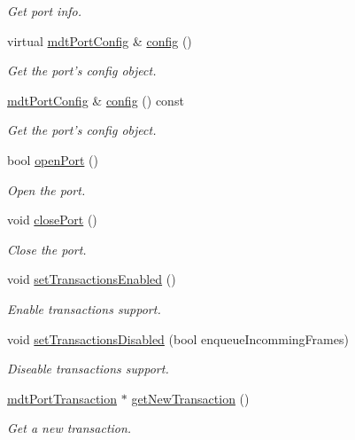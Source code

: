 \begin{DoxyCompactItemize}
\begin{DoxyCompactList}\small\item\em Get port info. \end{DoxyCompactList}\item 
virtual \hyperlink{classmdt_port_config}{mdtPortConfig} \& \hyperlink{classmdt_port_manager_a9cf3ea2da38f81682695b37448712ffd}{config} ()
\begin{DoxyCompactList}\small\item\em Get the port's config object. \end{DoxyCompactList}\item 
\hyperlink{classmdt_port_config}{mdtPortConfig} \& \hyperlink{classmdt_port_manager_a735b7dc766fc2f45fb2cf9772c4201b0}{config} () const 
\begin{DoxyCompactList}\small\item\em Get the port's config object. \end{DoxyCompactList}\item 
bool \hyperlink{classmdt_port_manager_aab594613e8985590c835194efbc27b5e}{openPort} ()
\begin{DoxyCompactList}\small\item\em Open the port. \end{DoxyCompactList}\item 
void \hyperlink{classmdt_port_manager_ace8065f1f5083041ee7f65c2892bc77d}{closePort} ()
\begin{DoxyCompactList}\small\item\em Close the port. \end{DoxyCompactList}\item 
void \hyperlink{classmdt_port_manager_a7f0bc97ad55160ea09b9079dd6d816d4}{setTransactionsEnabled} ()
\begin{DoxyCompactList}\small\item\em Enable transactions support. \end{DoxyCompactList}\item 
void \hyperlink{classmdt_port_manager_a40f6d2a420d1ce103af207237c45901a}{setTransactionsDisabled} (bool enqueueIncommingFrames)
\begin{DoxyCompactList}\small\item\em Diseable transactions support. \end{DoxyCompactList}\item 
\hyperlink{classmdt_port_transaction}{mdtPortTransaction} $\ast$ \hyperlink{classmdt_port_manager_a75ebd3d1859e3ed38b9558981e53aac4}{getNewTransaction} ()
\begin{DoxyCompactList}\small\item\em Get a new transaction. \end{DoxyCompactList}\item 

\end{DoxyCompactItemize}
